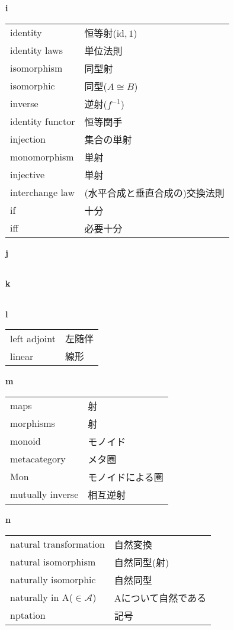 \documentclass[dvipdfmx]{jsarticle}
\begin{document}
\textbf{i}

  \begin{tabular}{ll}
    identity & 恒等射($\mathrm{id},1$) \\
    identity laws & 単位法則 \\
    isomorphism & 同型射 \\
    isomorphic & 同型($A \cong B$) \\
    inverse & 逆射($f^{-1}$) \\
    identity functor & 恒等関手 \\
    injection & 集合の単射 \\
    monomorphism & 単射 \\
    injective & 単射 \\
    interchange law & (水平合成と垂直合成の)交換法則 \\
    if & 十分 \\
    iff & 必要十分 \\
  \end{tabular}

\textbf{j}

  \begin{tabular}{ll}
  \end{tabular}

\textbf{k}

  \begin{tabular}{ll}
  \end{tabular}

\textbf{l}

  \begin{tabular}{ll}
    left adjoint & 左随伴 \\
    linear & 線形 \\
  \end{tabular}

\textbf{m}

  \begin{tabular}{ll}
    maps & 射 \\
    morphisms & 射 \\
    monoid & モノイド \\
    metacategory & メタ圏 \\
    Mon & モノイドによる圏 \\
    mutually inverse & 相互逆射 \\
  \end{tabular}

\textbf{n}

  \begin{tabular}{ll}
    natural transformation & 自然変換 \\
    natural isomorphism & 自然同型(射) \\
    naturally isomorphic & 自然同型 \\
    naturally in A($\in \mathscr{A}$) & Aについて自然である \\
    nptation & 記号 \\
  \end{tabular}
\end{document}
